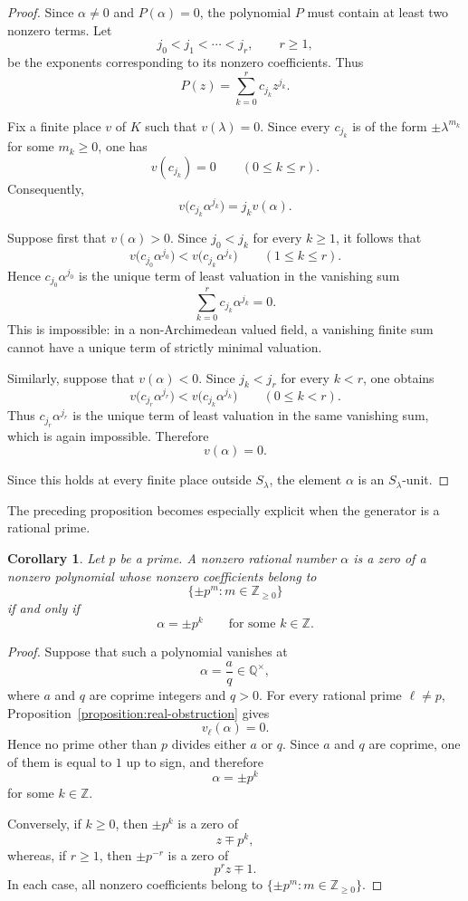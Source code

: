 \documentclass[10pt]{amsart}
\newtheorem{corollary}[theorem]{Corollary}
\theoremstyle{definition}
\theoremstyle{remark}
\numberwithin{equation}{section}
\newcommand{\Z}{\mathbb Z}
\newcommand{\Q}{\mathbb Q}
\begin{document}
\begin{proof}
Since $\alpha\neq0$ and $P(\alpha)=0$, the polynomial $P$ must contain at
least two nonzero terms. Let
\[
        j_0<j_1<\cdots<j_r,
        \qquad r\geq1,
\]
be the exponents corresponding to its nonzero coefficients. Thus
\[
        P(z)=\sum_{k=0}^{r}c_{j_k}z^{j_k}.
\]

Fix a finite place $v$ of $K$ such that $v(\lambda)=0$. Since every
$c_{j_k}$ is of the form $\pm\lambda^{m_k}$ for some $m_k\geq0$, one has
\[
        v(c_{j_k})=0
        \qquad(0\leq k\leq r).
\]
Consequently,
\[
        v\bigl(c_{j_k}\alpha^{j_k}\bigr)
        =
        j_kv(\alpha).
\]

Suppose first that $v(\alpha)>0$. Since
$j_0<j_k$ for every $k\geq1$, it follows that
\[
        v\bigl(c_{j_0}\alpha^{j_0}\bigr)
        <
        v\bigl(c_{j_k}\alpha^{j_k}\bigr)
        \qquad(1\leq k\leq r).
\]
Hence $c_{j_0}\alpha^{j_0}$ is the unique term of least valuation in the
vanishing sum
\[
        \sum_{k=0}^{r}c_{j_k}\alpha^{j_k}=0.
\]
This is impossible: in a non-Archimedean valued field, a vanishing finite
sum cannot have a unique term of strictly minimal valuation.

Similarly, suppose that $v(\alpha)<0$. Since $j_k<j_r$ for every
$k<r$, one obtains
\[
        v\bigl(c_{j_r}\alpha^{j_r}\bigr)
        <
        v\bigl(c_{j_k}\alpha^{j_k}\bigr)
        \qquad(0\leq k<r).
\]
Thus $c_{j_r}\alpha^{j_r}$ is the unique term of least valuation in the
same vanishing sum, which is again impossible. Therefore
\[
        v(\alpha)=0.
\]

Since this holds at every finite place outside $S_\lambda$, the element
$\alpha$ is an $S_\lambda$-unit.
\end{proof}

The preceding proposition becomes especially explicit when the generator is
a rational prime.

\begin{corollary}\label{corollary:prime-real-obstruction}
Let $p$ be a prime. A nonzero rational number $\alpha$ is a zero of a
nonzero polynomial whose nonzero coefficients belong to
\[
        \{\pm p^m:m\in\Z_{\geq0}\}
\]
if and only if
\[
        \alpha=\pm p^k
        \qquad\text{for some }k\in\Z.
\]
\end{corollary}

\begin{proof}
Suppose that such a polynomial vanishes at
\[
        \alpha=\frac{a}{q}\in\Q^\times,
\]
where $a$ and $q$ are coprime integers and $q>0$. For every rational prime
$\ell\neq p$, Proposition~\ref{proposition:real-obstruction} gives
\[
        v_\ell(\alpha)=0.
\]
Hence no prime other than $p$ divides either $a$ or $q$. Since $a$ and $q$
are coprime, one of them is equal to $1$ up to sign, and therefore
\[
        \alpha=\pm p^k
\]
for some $k\in\Z$.

Conversely, if $k\geq0$, then $\pm p^k$ is a zero of
\[
        z\mp p^k,
\]
whereas, if $r\geq1$, then $\pm p^{-r}$ is a zero of
\[
        p^rz\mp1.
\]
In each case, all nonzero coefficients belong to
$\{\pm p^m:m\in\Z_{\geq0}\}$.
\end{proof}
\end{document}
